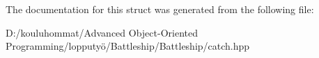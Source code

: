 The documentation for this struct was generated from the following file\+:\begin{DoxyCompactItemize}
\item 
D\+:/kouluhommat/\+Advanced Object-\/\+Oriented Programming/lopputyö/\+Battleship/\+Battleship/catch.\+hpp\end{DoxyCompactItemize}
